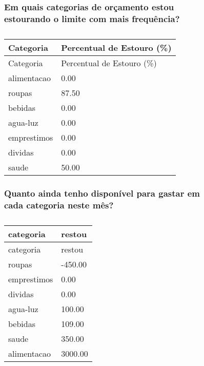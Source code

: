 \documentclass[
  8pt,
  a4paper,
  DIV=11,
  numbers=noendperiod]{scrartcl}
\begin{document}
\begin{figure}

\begin{minipage}{0.50\linewidth}

\subsubsection{Em quais categorias de orçamento estou estourando o
limite com mais
frequência?}\label{em-quais-categorias-de-oruxe7amento-estou-estourando-o-limite-com-mais-frequuxeancia}

\begin{longtable}[]{@{}ll@{}}
\caption{}\label{T_36fe2}\tabularnewline
\toprule\noalign{}
Categoria & Percentual de Estouro (\%) \\
\midrule\noalign{}
\endfirsthead
\toprule\noalign{}
Categoria & Percentual de Estouro (\%) \\
\midrule\noalign{}
\endhead
\bottomrule\noalign{}
\endlastfoot
alimentacao & 0.00 \\
roupas & 87.50 \\
bebidas & 0.00 \\
agua-luz & 0.00 \\
emprestimos & 0.00 \\
dividas & 0.00 \\
saude & 50.00 \\
\end{longtable}

\end{minipage}%
%
\begin{minipage}{0.50\linewidth}

\subsubsection{Quanto ainda tenho disponível para gastar em cada
categoria neste
mês?}\label{quanto-ainda-tenho-disponuxedvel-para-gastar-em-cada-categoria-neste-muxeas}

\begin{longtable}[]{@{}ll@{}}
\caption{}\label{T_df07c}\tabularnewline
\toprule\noalign{}
categoria & restou \\
\midrule\noalign{}
\endfirsthead
\toprule\noalign{}
categoria & restou \\
\midrule\noalign{}
\endhead
\bottomrule\noalign{}
\endlastfoot
roupas & -450.00 \\
emprestimos & 0.00 \\
dividas & 0.00 \\
agua-luz & 100.00 \\
bebidas & 109.00 \\
saude & 350.00 \\
alimentacao & 3000.00 \\
\end{longtable}

\end{minipage}%

\end{figure}%
\end{document}
